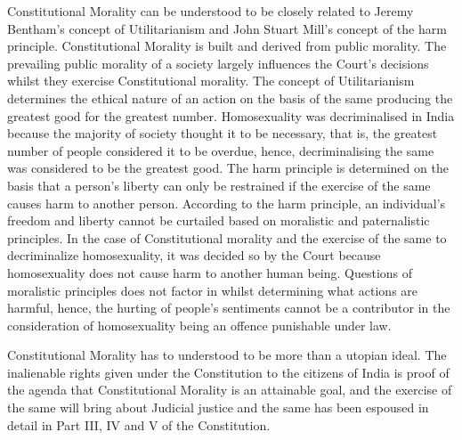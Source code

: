 \begin{multicols}{2}

\noi
Constitutional Morality can be understood to be closely related to Jeremy Bentham’s concept
of Utilitarianism and John Stuart Mill’s concept of the harm principle. Constitutional
Morality is built and derived from public morality. The prevailing public morality of a
society largely influences the Court’s decisions whilst they exercise Constitutional morality.
The concept of Utilitarianism determines the ethical nature of an action on the basis of the
same producing the greatest good for the greatest number. Homosexuality was decriminalised
in India because the majority of society thought it to be necessary, that is, the greatest number
of people considered it to be overdue, hence, decriminalising the same was considered to be
the greatest good. The harm principle is determined on the basis that a person’s liberty can
only be restrained if the exercise of the same causes harm to another person. According to the
harm principle, an individual’s freedom and liberty cannot be curtailed based on moralistic
and paternalistic principles. In the case of Constitutional morality and the exercise of the
same to decriminalize homosexuality, it was decided so by the Court because homosexuality
does not cause harm to another human being. Questions of moralistic principles does not
factor in whilst determining what actions are harmful, hence, the hurting of people’s
sentiments cannot be a contributor in the consideration of homosexuality being an offence
punishable under law.


\noi
Constitutional Morality has to understood to be more than a utopian ideal. The inalienable
rights given under the Constitution to the citizens of India is proof of the agenda that
Constitutional Morality is an attainable goal, and the exercise of the same will bring about
Judicial justice and the same has been espoused in detail in Part III, IV and V of the
Constitution.


\end{multicols}
